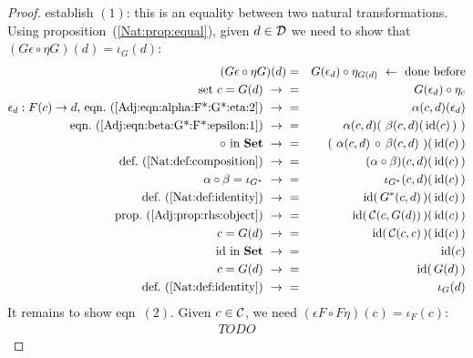 \begin{proof}
    establish $(1)$: this is an equality between two natural transformations.
    Using proposition~(\ref{Nat:prop:equal}), given $d\in\mbox{$\cal D$}$ we need to show
    that $(G\epsilon \circ\eta G)(d) = \iota_{G}(d)$:
        \begin{eqnarray*}(G\epsilon \circ\eta G)(d)
            &=&G(\epsilon_{d})\circ\eta_{G(d)}
            \ \leftarrow\ \mbox{done before}\\
            \mbox{set $c=G(d)$}\ \to\ 
            &=&G(\epsilon_{d})\circ\eta_{c}\\
            \mbox{$\epsilon_{d}:F(c)\to d$,\ 
            eqn.~(\ref{Adj:eqn:alpha:F*:G*:eta:2})}\ \to\ 
            &=&\alpha(c,d)(\epsilon_{d})\\
            \mbox{eqn.~(\ref{Adj:eqn:beta:G*:F*:epsilon:1})}\ \to\ 
            &=&\alpha(c,d)(\ \beta(c,d)(\,\id(c)\,) \ )\\
            \mbox{$\circ$ in \Set}\ \to\ 
            &=&(\ \alpha(c,d)\,\circ\,\beta(c,d)\ )(\,\id(c)\,)\\
            \mbox{def.~(\ref{Nat:def:composition})}\ \to\ 
            &=&(\alpha\circ\beta)(c,d)(\,\id(c)\,)\\
            \mbox{$\alpha\circ\beta=\iota_{G^{*}}$}\ \to\ 
            &=&\iota_{G^{*}}(c,d)(\,\id(c)\,)\\
            \mbox{def.~(\ref{Nat:def:identity})}\ \to\ 
            &=&\id(\,G^{*}(c,d)\,)(\,\id(c)\,)\\
            \mbox{prop.~(\ref{Adj:prop:rhs:object})}\ \to\ 
            &=&\id(\,\Cat(c,G(d))\,)(\,\id(c)\,)\\
            \mbox{$c = G(d)$}\ \to\ 
            &=&\id(\,\Cat(c,c)\,)(\,\id(c)\,)\\
            \mbox{$\id$ in \Set}\ \to\ 
            &=&\id(c)\\
            \mbox{$c = G(d)$}\ \to\ 
            &=&\id(\,G(d)\,)\\
            \mbox{def.~(\ref{Nat:def:identity})}\ \to\ 
            &=&\iota_{G}(d)\\
        \end{eqnarray*}
    It remains to show eqn~$(2)$. Given $c\in\mbox{$\cal C$}$, we need 
    $(\epsilon F \circ F\eta)(c)=\iota_{F}(c)$:
        \begin{eqnarray*}
            TODO
        \end{eqnarray*}
\end{proof}

